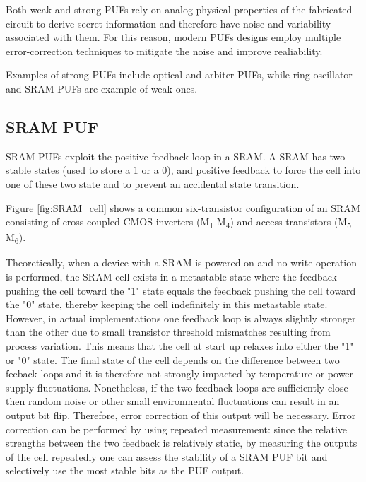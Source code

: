 Both weak and strong PUFs rely on analog physical properties of the fabricated circuit to derive secret information and therefore have noise and variability associated with them. For this reason, modern PUFs designs employ multiple error-correction techniques to mitigate the noise and improve realiability.

Examples of strong PUFs include optical and arbiter PUFs, while ring-oscillator and SRAM PUFs are example of weak ones. \cite{PUF_IEEE_Herder}

\subsection{SRAM PUF}
SRAM PUFs exploit the positive feedback loop in a SRAM. A SRAM has two stable states (used to store a 1 or a 0), and positive feedback to force the cell into one of these two state and to prevent an accidental state transition. 

Figure \ref{fig:SRAM_cell} shows a common six-transistor configuration of an SRAM consisting of cross-coupled CMOS inverters (M\textsubscript{1}-M\textsubscript{4}) and access transistors (M\textsubscript{5}-M\textsubscript{6}).

Theoretically, when a device with a SRAM is powered on and no write operation is performed, the SRAM cell exists in a metastable state where the feedback pushing the cell toward the "1" state equals the feedback pushing the cell toward the "0" state, thereby keeping the cell indefinitely in this metastable state. However, in actual implementations one feedback loop is always slightly stronger than the other due to small transistor threshold mismatches resulting from process variation. This means that the cell at start up relaxes into either the "1" or "0" state. The final state of the cell depends on the difference between two feeback loops and it is therefore not strongly impacted by temperature or power supply fluctuations. Nonetheless, if the two feedback loops are sufficiently close then random noise or other small environmental fluctuations can result in an output bit flip. Therefore, error correction of this output will be necessary. Error correction can be performed by using repeated measurement: since the relative strengths between the two feedback is relatively static, by measuring the outputs of the cell repeatedly one can assess the stability of a SRAM PUF bit and selectively use the most stable bits as the PUF output. \cite{PUF_IEEE_Herder}

